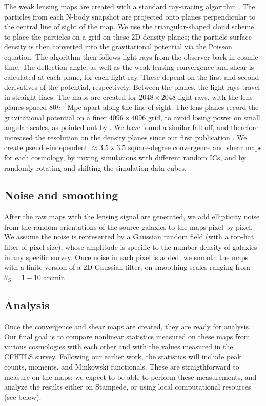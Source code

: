 \documentclass[10pt, preprint]{aastex}
\begin{document}
The weak lensing maps are created with a standard ray-tracing
algorithm \citep{H&M01}. The particles from each N-body snapshot are
projected onto planes perpendicular to the central line of sight of
the map.  We use the triangular-shaped cloud scheme
\citep{Hockney-Eastwood} to place the particles on a grid on these 2D
density planes; the particle surface density is then converted into
the gravitational potential via the Poisson equation. The algorithm
then follows light rays from the observer back in cosmic time. The
deflection angle, as well as the weak lensing convergence and shear is
calculated at each plane, for each light ray. These depend on the
first and second derivatives of the potential, respectively. Between
the planes, the light rays travel in straight lines.  The maps are
created for $2048\times2048$ light rays, with the lens planes spaced
$80h^{-1}$Mpc apart along the line of sight. The lens planes record
the gravitational potential on a finer $4096\times4096$ grid, to avoid
losing power on small angular scales, as pointed out by
\citet{Sato09}. We have found a similar fall-off, and therefore
increased the resolution on the density planes since our first
publication \citep{KHM09}.  We create pseudo-independent $\approx
3.5\times3.5$ square-degree convergence and shear maps for each
cosmology, by mixing simulations with different random ICs, and by
randomly rotating and shifting the simulation data cubes.

\subsection{Noise and smoothing}

After the raw maps with the lensing signal are generated, we add
ellipticity noise from the random orientations of the source galaxies
to the maps pixel by pixel.  We assume the noise is represented by a
Gaussian random field (with a top-hat filter of pixel size), whose
amplitude is specific to the number density of galaxies in any
specific survey. Once noise in each pixel is added, we smooth the maps
with a finite version of a 2D Gaussian filter, on smoothing scales
ranging from $\theta_G = 1-10$ arcmin.

\subsection{Analysis}

Once the convergence and shear maps are created, they are ready for
analysis. Our final goal is to compare nonlinear statistics measured
on these maps from various cosmologies with each other and with the
values measured in the CFHTLS survey.  Following our earlier work, the
statistics will include peak counts, moments, and Minkowski
functionals. These are straigthforward to measure on the maps; we
expect to be able to perform these measurements, and analyze the
results either on Stampede, or using local computational resources
(see below).
\end{document}
